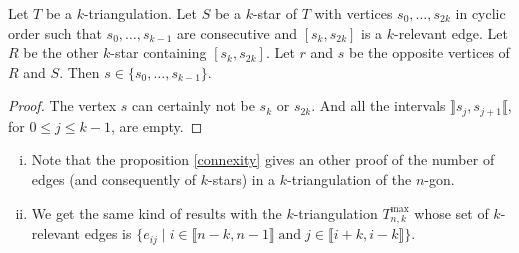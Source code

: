 \documentclass[12pt]{amsart}
\begin{document}
\begin{lemma}
Let $T$ be a $k$-triangulation. Let $S$ be a $k$-star of $T$ with vertices $s_0,\ldots, s_{2k}$ in cyclic order such that $s_0,\ldots,s_{k-1}$ are consecutive and $[s_k,s_{2k}]$ is a $k$-relevant edge. Let $R$ be the other $k$-star containing $[s_k,s_{2k}]$. Let $r$ and $s$ be the opposite vertices of $R$ and $S$. Then $s\in\{s_0,\ldots,s_{k-1}\}$.
\end{lemma}

\begin{proof}
The vertex $s$ can certainly not be $s_k$ or $s_{2k}$. And all the intervals $\rrbracket s_j,s_{j+1}\llbracket$, for $0\le j\le k-1$, are empty.
\end{proof}


\begin{remark}
\begin{enumerate}[(i)]
\item Note that the proposition \ref{connexity} gives an other proof of the number of edges (and consequently of $k$-stars) in a $k$-triangulation of the $n$-gon.
\item We get the same kind of results with the $k$-triangulation $T_{n,k}^{\max}$ whose set of $k$-relevant edges is $\{e_{ij}\;|\;i\in\llbracket n-k,n-1\rrbracket\;\mathrm{and}\;j\in\llbracket i+k,i-k\rrbracket\}$.
\end{enumerate}
\end{remark}
\end{document}
